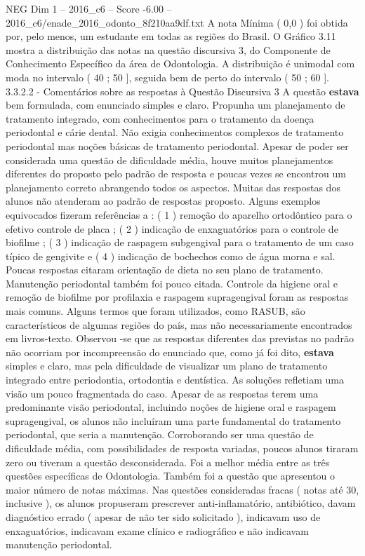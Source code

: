\begin{textsample}{NEG Dim 1 – 2016\_c6 – Score -6.00 – 2016\_c6/enade\_2016\_odonto\_8f210aa9df.txt}
A nota Mínima ( 0,0 ) foi obtida por, pelo menos, um estudante em todas as regiões do Brasil.
O Gráfico 3.11 mostra a distribuição das notas na questão discursiva 3, do Componente de Conhecimento Específico da área de Odontologia.
A distribuição é unimodal com moda no intervalo ( 40 ; 50 ], seguida bem de perto do intervalo ( 50 ; 60 ]. 3.3.2.2 - Comentários sobre as respostas à Questão Discursiva 3 A questão \textbf{estava} bem formulada, com enunciado simples e claro.
Propunha um planejamento de tratamento integrado, com conhecimentos para o tratamento da doença periodontal e cárie dental.
Não exigia conhecimentos complexos de tratamento periodontal mas noções básicas de tratamento periodontal.
Apesar de poder ser considerada uma questão de dificuldade média, houve muitos planejamentos diferentes do proposto pelo padrão de resposta e poucas vezes se encontrou um planejamento correto abrangendo todos os aspectos.
Muitas das respostas dos alunos não atenderam ao padrão de respostas proposto.
Alguns exemplos equivocados fizeram referências a : ( 1 ) remoção do aparelho ortodôntico para o efetivo controle de placa ; ( 2 ) indicação de enxaguatórios para o controle de biofilme ; ( 3 ) indicação de raspagem subgengival para o tratamento de um caso típico de gengivite e ( 4 ) indicação de bochechos como de água morna e sal.
Poucas respostas citaram orientação de dieta no seu plano de tratamento.
Manutenção periodontal também foi pouco citada.
Controle da higiene oral e remoção de biofilme por profilaxia e raspagem supragengival foram as respostas mais comuns.
Alguns termos que foram utilizados, como RASUB, são característicos de algumas regiões do país, mas não necessariamente encontrados em livros-texto.
Observou -se que as respostas diferentes das previstas no padrão não ocorriam por incompreensão do enunciado que, como já foi dito, \textbf{estava} simples e claro, mas pela dificuldade de visualizar um plano de tratamento integrado entre periodontia, ortodontia e dentística.
As soluções refletiam uma visão um pouco fragmentada do caso.
Apesar de as respostas terem uma predominante visão periodontal, incluindo noções de higiene oral e raspagem supragengival, os alunos não incluíram uma parte fundamental do tratamento periodontal, que seria a manutenção.
Corroborando ser uma questão de dificuldade média, com possibilidades de resposta variadas, poucos alunos tiraram zero ou tiveram a questão desconsiderada.
Foi a melhor média entre as três questões específicas de Odontologia.
Também foi a questão que apresentou o maior número de notas máximas.
Nas questões consideradas fracas ( notas até 30, inclusive ), os alunos propuseram prescrever anti-inflamatório, antibiótico, davam diagnóstico errado ( apesar de não ter sido solicitado ), indicavam uso de enxaguatórios, indicavam exame clínico e radiográfico e não indicavam manutenção periodontal.

\end{textsample}
